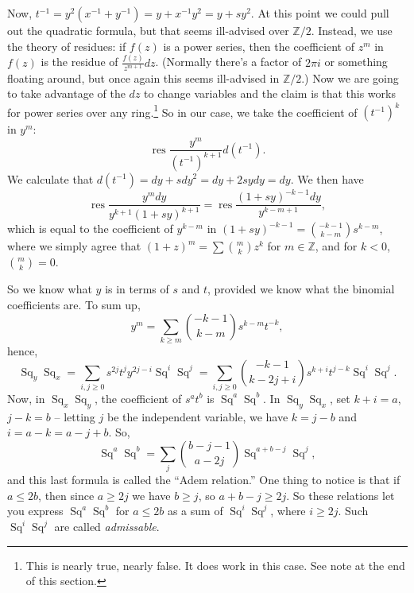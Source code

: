 \documentclass{article}
\newcommand{\Z}{\mathbb{Z}}
\DeclareMathOperator{\res}{res}
\DeclareMathOperator{\Sq}{Sq}
\begin{document}
Now, $t^{-1} = y^2(x^{-1} + y^{-1}) = y + x^{-1} y^2 = y + s y^2$.  At this point we could pull out the quadratic formula, but that seems ill-advised over $\Z/2$.  Instead, we use the theory of residues: if $f(z)$ is a power series, then the coefficient of $z^m$ in $f(z)$ is the residue of $\frac{f(z)}{z^{m+1}}dz$.  (Normally there's a factor of $2 \pi i$ or something floating around, but once again this seems ill-advised in $\Z/2$.)  Now we are going to take advantage of the $dz$ to change variables and the claim is that this works for power series over any ring.\footnote{This is nearly true, nearly false.  It does work in this case.  See note at the end of this section. %
}  So in our case, we take the coefficient of $(t^{-1})^k$ in $y^m$: \[\res \frac{y^m}{(t^{-1})^{k+1}} d(t^{-1}).\]  We calculate that $d(t^{-1}) = dy + sdy^2 = dy + 2sydy = dy$.  We then have \[\res \frac{y^m dy}{y^{k+1}(1 + sy)^{k+1}} = \res \frac{(1+sy)^{-k-1} dy}{y^{k-m+1}},\] which is equal to the coefficient of $y^{k-m}$ in $(1+sy)^{-k-1} = \binom{-k-1}{k-m}s^{k-m}$, where we simply agree that $(1 + z)^m = \sum \binom{m}{k} z^k$ for $m \in \Z$, and for $k < 0$, $\binom{m}{k} = 0$.

So we know what $y$ is in terms of $s$ and $t$, provided we know what the binomial coefficients are.  To sum up,
\[
y^m = \sum_{k \ge m} \binom{-k-1}{k-m} s^{k-m} t^{-k}
,\]
hence,
\[
\Sq_y \Sq_x = \sum_{i, j \ge 0} s^{2j} t^j y^{2j-i} \Sq^i \Sq^j = \sum_{i, j \ge 0} \binom{-k-1}{k-2j+i} s^{k+i}t^{j-k}\Sq^i\Sq^j
.\]
Now, in $\Sq_x \Sq_y$, the coefficient of $s^a t^b$ is $\Sq^a \Sq^b$.  In $\Sq_y \Sq_x$, set $k + i = a$, $j - k = b$ -- letting $j$ be the independent variable, we have $k = j - b$ and $i = a - k = a - j + b$.  So,
\[
\Sq^a \Sq^b = \sum_j \binom{b-j-1}{a-2j} \Sq^{a+b-j} \Sq^j
,\]
and this last formula is called the ``Adem relation.''  One thing to notice is that if $a \le 2b$, then since $a \ge 2j$ we have $b \ge j$, so $a + b -j \ge 2j$.  So these relations let you express $\Sq^a \Sq^b$ for $a \le 2b$ as a sum of $\Sq^i \Sq^j$, where $i \ge 2j$.  Such $\Sq^i \Sq^j$ are called \emph{admissable}.
\end{document}
